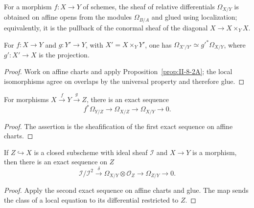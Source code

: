 \begin{definition}
\label{def:II-8-sheaf-differentials}
For a morphism $f:X\to Y$ of schemes, the sheaf of relative differentials $\Omega_{X/Y}$ is obtained
on affine opens from the modules $\Omega_{B/A}$ and glued using localization; equivalently, it is
the pullback of the conormal sheaf of the diagonal $X\to X\times_YX$.
\end{definition}

\begin{proposition}
\label{prop:II-8-10}
For $f:X\to Y$ and $g:Y'\to Y$, with $X'=X\times_YY'$, one has
$\Omega_{X'/Y'}\simeq g'^*\Omega_{X/Y}$, where $g':X'\to X$ is the projection.
\end{proposition}
\begin{proof}
Work on affine charts and apply Proposition~\ref{prop:II-8-2A}; the local isomorphisms agree on
overlaps by the universal property and therefore glue.
\end{proof}

\begin{proposition}
\label{prop:II-8-11}
For morphisms $X\xrightarrow{f}Y\xrightarrow{g}Z$, there is an exact sequence
\[
f^*\Omega_{Y/Z}\longrightarrow\Omega_{X/Z}\longrightarrow\Omega_{X/Y}\longrightarrow0.
\]
\end{proposition}
\begin{proof}
The assertion is the sheafification of the first exact sequence on affine charts.
\end{proof}

\begin{proposition}
\label{prop:II-8-12}
If $Z\hookrightarrow X$ is a closed subscheme with ideal sheaf $\mathcal I$ and $X\to Y$ is a
morphism, then there is an exact sequence on $Z$
\[
\mathcal I/\mathcal I^2\xrightarrow{\delta}\Omega_{X/Y}\otimes\mathcal O_Z\longrightarrow\Omega_{Z/Y}\longrightarrow0.
\]
\end{proposition}
\begin{proof}
Apply the second exact sequence on affine charts and glue.  The map sends the class of a local
equation to its differential restricted to $Z$.
\end{proof}

